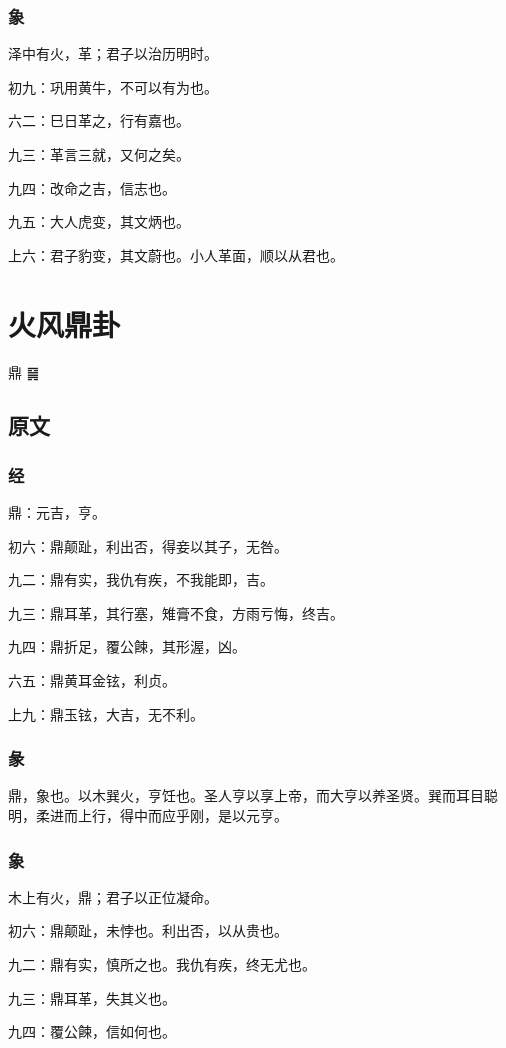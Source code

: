 \documentclass[12pt,oneside]{book}
\begin{document}
\subsection{象}
泽中有火，革；君子以治历明时。

初九：巩用黄牛，不可以有为也。

六二：巳日革之，行有嘉也。

九三：革言三就，又何之矣。

九四：改命之吉，信志也。

九五：大人虎变，其文炳也。

上六：君子豹变，其文蔚也。小人革面，顺以从君也。


\chapter{火风鼎卦}
鼎 {\large ䷱}
\section{原文}

\subsection{经}
鼎：元吉，亨。

初六：鼎颠趾，利出否，得妾以其子，无咎。

九二：鼎有实，我仇有疾，不我能即，吉。

九三：鼎耳革，其行塞，雉膏不食，方雨亏悔，终吉。

九四：鼎折足，覆公餗，其形渥，凶。

六五：鼎黄耳金铉，利贞。

上九：鼎玉铉，大吉，无不利。

\subsection{彖}
鼎，象也。以木巽火，亨饪也。圣人亨以享上帝，而大亨以养圣贤。巽而耳目聪明，柔进而上行，得中而应乎刚，是以元亨。

\subsection{象}
木上有火，鼎；君子以正位凝命。

初六：鼎颠趾，未悖也。利出否，以从贵也。

九二：鼎有实，慎所之也。我仇有疾，终无尤也。

九三：鼎耳革，失其义也。

九四：覆公餗，信如何也。
\end{document}
